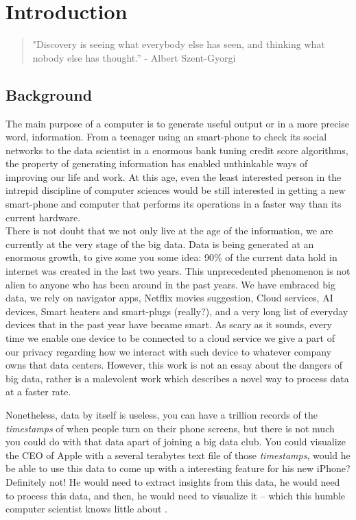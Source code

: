 \section{Introduction}

\begin{verse} "Discovery is seeing what everybody else has seen, and thinking
what nobody else has thought.” - Albert Szent-Gyorgi \end{verse}

\subsection{Background} The main purpose of a computer is to generate useful
output or in a more precise word, information. From a teenager using an
smart-phone to check its social networks to the data scientist in a enormous
bank tuning credit score algorithms, the property of generating information has
enabled unthinkable ways of improving our life and work. At this age, even the least
interested person in the intrepid discipline of computer sciences would be still interested in 
getting a new smart-phone and computer that performs its operations in a faster way than its 
current hardware.\\

There is not doubt that we not only live at the age of the information, we are currently at the 
very stage of the big data. Data is being generated at an enormous growth, to give some you some idea: 90\% of the current data hold in internet was created in the last two years\cite{furht2016big}. This unprecedented phenomenon is not alien to anyone who has been around in the past years. We have embraced 
big data, we rely on navigator apps, Netflix movies suggestion, Cloud services, AI devices, Smart heaters and smart-plugs (really?), and a very long list of everyday devices that in the past year have became smart.
As scary as it sounds, every time we enable one device to be connected to a cloud service we give a part of our privacy regarding how we interact with such device to whatever company owns that data centers. However, this work is not an essay about the dangers of big data, rather is a malevolent work which
describes a novel way to process data at a faster rate.

Nonetheless, data by itself is useless, you can have a trillion records of the
\textit{timestamps} of when people turn on their phone screens, but there is not
much you could do with that data apart of joining a big data club. You could
visualize the CEO of Apple with a several terabytes text file of those
\textit{timestamps}, would he be able to use this data to come up with a
interesting feature for his new iPhone? Definitely not! He would need to extract
insights from this data, he would need to process this data, and then, he would need to
visualize it -- which this humble computer scientist knows little about . \\

